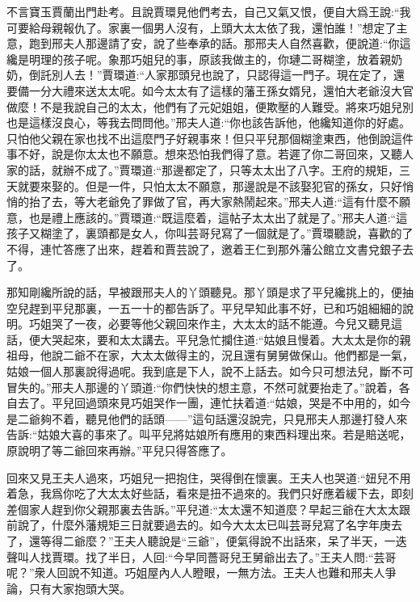\begin{parag}
    不言寶玉賈蘭出門赴考。且說賈環見他們考去，自己又氣又恨，便自大爲王說:“我可要給母親報仇了。家裏一個男人沒有，上頭大太太依了我，還怕誰！”想定了主意，跑到邢夫人那邊請了安，說了些奉承的話。那邢夫人自然喜歡，便說道:“你這纔是明理的孩子呢。象那巧姐兒的事，原該我做主的，你璉二哥糊塗，放着親奶奶，倒託別人去！”賈環道:“人家那頭兒也說了，只認得這一門子。現在定了，還要備一分大禮來送太太呢。如今太太有了這樣的藩王孫女婿兒，還怕大老爺沒大官做麼！不是我說自己的太太，他們有了元妃姐姐，便欺壓的人難受。將來巧姐兒別也是這樣沒良心，等我去問問他。”邢夫人道:“你也該告訴他，他纔知道你的好處。只怕他父親在家也找不出這麼門子好親事來！但只平兒那個糊塗東西，他倒說這件事不好，說是你太太也不願意。想來恐怕我們得了意。若遲了你二哥回來，又聽人家的話，就辦不成了。”賈環道:“那邊都定了，只等太太出了八字。王府的規矩，三天就要來娶的。但是一件，只怕太太不願意，那邊說是不該娶犯官的孫女，只好悄悄的抬了去，等大老爺免了罪做了官，再大家熱鬧起來。”邢夫人道:“這有什麼不願意，也是禮上應該的。”賈環道:“既這麼着，這帖子太太出了就是了。”邢夫人道:“這孩子又糊塗了，裏頭都是女人，你叫芸哥兒寫了一個就是了。”賈環聽說，喜歡的了不得，連忙答應了出來，趕着和賈芸說了，邀着王仁到那外藩公館立文書兌銀子去了。
\end{parag}


\begin{parag}
    那知剛纔所說的話，早被跟邢夫人的丫頭聽見。那丫頭是求了平兒纔挑上的，便抽空兒趕到平兒那裏，一五一十的都告訴了。平兒早知此事不好，已和巧姐細細的說明。巧姐哭了一夜，必要等他父親回來作主，大太太的話不能遵。今兒又聽見這話，便大哭起來，要和太太講去。平兒急忙攔住道:“姑娘且慢着。大太太是你的親祖母，他說二爺不在家，大太太做得主的，況且還有舅舅做保山。他們都是一氣，姑娘一個人那裏說得過呢。我到底是下人，說不上話去。如今只可想法兒，斷不可冒失的。”邢夫人那邊的丫頭道:“你們快快的想主意，不然可就要抬走了。”說着，各自去了。平兒回過頭來見巧姐哭作一團，連忙扶着道:“姑娘，哭是不中用的，如今是二爺夠不着，聽見他們的話頭——”這句話還沒說完，只見邢夫人那邊打發人來告訴:“姑娘大喜的事來了。叫平兒將姑娘所有應用的東西料理出來。若是賠送呢，原說明了等二爺回來再辦。”平兒只得答應了。
\end{parag}


\begin{parag}
    回來又見王夫人過來，巧姐兒一把抱住，哭得倒在懷裏。王夫人也哭道:“妞兒不用着急，我爲你吃了大太太好些話，看來是扭不過來的。我們只好應着緩下去，即刻差個家人趕到你父親那裏去告訴。”平兒道:“太太還不知道麼？早起三爺在大太太跟前說了，什麼外藩規矩三日就要過去的。如今大太太已叫芸哥兒寫了名字年庚去了，還等得二爺麼？”王夫人聽說是“三爺”，便氣得說不出話來，呆了半天，一迭聲叫人找賈環。找了半日，人回:“今早同薔哥兒王舅爺出去了。”王夫人問:“芸哥呢？”衆人回說不知道。巧姐屋內人人瞪眼，一無方法。王夫人也難和邢夫人爭論，只有大家抱頭大哭。
\end{parag}


